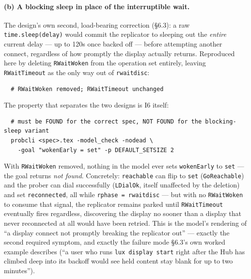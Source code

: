 \documentclass[a4paper,10pt,fleqn]{article}
\begin{document}
\paragraph{(b) A blocking sleep in place of the interruptible wait.}
The design's own second, load-bearing correction (\S6.3): a raw
\texttt{time.sleep(delay)} would commit the replicator to sleeping out the
\emph{entire} current delay --- up to 120s once backed off --- before
attempting another connect, regardless of how promptly the display actually
returns.  Reproduced here by deleting \texttt{RWaitWoken} from the
operation set entirely, leaving \texttt{RWaitTimeout} as the only way out
of \texttt{rwaitdisc}:
\begin{verbatim}
  # RWaitWoken removed; RWaitTimeout unchanged
\end{verbatim}
The property that separates the two designs is I6 itself:
\begin{verbatim}
  # must be FOUND for the correct spec, NOT FOUND for the blocking-sleep variant
  probcli <spec>.tex -model_check -nodead \
    -goal "wokenEarly = set" -p DEFAULT_SETSIZE 2
\end{verbatim}
With \texttt{RWaitWoken} removed, nothing in the model ever sets
\texttt{wokenEarly} to \texttt{set} --- the goal returns \emph{not found}.
Concretely: \texttt{reachable} can flip to \texttt{set}
(\texttt{GoReachable}) and the prober can dial successfully
(\texttt{LDialOk}, itself unaffected by the deletion) and set
\texttt{reconnected}, all while \texttt{rphase = rwaitdisc} --- but with no
\texttt{RWaitWoken} to consume that signal, the replicator remains parked
until \texttt{RWaitTimeout} eventually fires regardless, discovering the
display no sooner than a display that never reconnected at all would have
been retried.  This is the model's rendering of ``a display connect not
promptly breaking the replicator out'' --- exactly the second required
symptom, and exactly the failure mode \S6.3's own worked example describes
(``a user who runs \texttt{lux display start} right after the Hub has
climbed deep into its backoff would see held content stay blank for up to
two minutes'').
\end{document}
